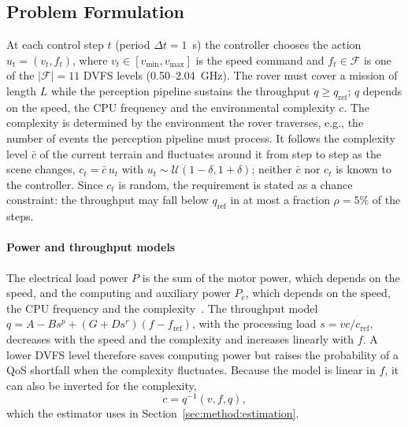 \subsection{Problem Formulation}
\label{sec:method:problem}

At each control step $t$ (period $\Delta t = 1$~s) the controller chooses the action
$u_t = (v_t, f_t)$, where $v_t \in [v_{\min}, v_{\max}]$ is the speed command and
$f_t \in \mathcal{F}$ is one of the $|\mathcal{F}| = 11$ \ac{DVFS} levels (0.50--2.04~GHz).
The rover must cover a mission of length $L$ while the perception pipeline sustains the
throughput $q \geq q_{\mathrm{ref}}$; $q$ depends on the speed, the \ac{CPU} frequency and the environmental complexity $c$.
The complexity is determined by the environment the rover traverses, e.g., the number of events
the perception pipeline must process. It follows the complexity level $\bar c$ of the current
terrain and fluctuates around it from step to step as the scene changes,
$c_t = \bar c\,u_t$ with $u_t \sim \mathcal{U}(1-\delta, 1+\delta)$; neither $\bar c$ nor $c_t$ is
known to the controller. Since $c_t$ is random, the requirement is stated as a chance constraint: the throughput may fall below
$q_{\mathrm{ref}}$ in at most a fraction $\rho = 5\%$ of the steps.

\paragraph{Power and throughput models}
The electrical load power $P$ is the sum of the motor power, which depends on the
speed, and the computing and auxiliary power $P_{\mathrm{c}}$, which depends on the speed, the \ac{CPU}
frequency and the complexity~\cite{REF}.
The throughput model
$q = A - B s^{p} + (G + D s^{r})(f - f_{\mathrm{ref}})$, with the processing load
$s = v c / c_{\mathrm{ref}}$, decreases with the speed and the complexity and increases linearly with $f$.
A lower \ac{DVFS} level therefore saves computing power but raises the probability of a \ac{QoS} shortfall
when the complexity fluctuates. Because the model is linear in $f$, it can also be inverted for the complexity,
\begin{equation}
  c = q^{-1}(v, f, q),
  \label{eq:fq}
\end{equation}
which the estimator uses in Section~\ref{sec:method:estimation}.

